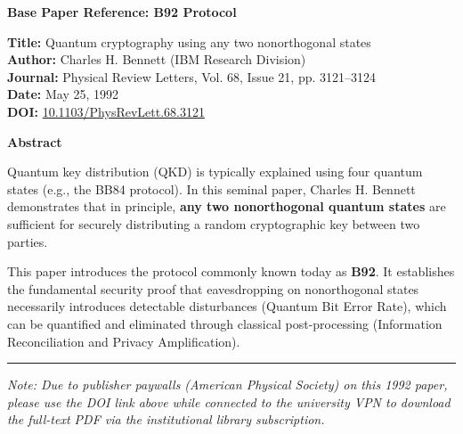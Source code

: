 \documentclass[12pt]{article}
\begin{document}
\begin{center}
    \Large\textbf{Base Paper Reference: B92 Protocol}
\end{center}
\vspace{0.5cm}

\noindent\textbf{Title:} Quantum cryptography using any two nonorthogonal states \\
\textbf{Author:} Charles H. Bennett (IBM Research Division) \\
\textbf{Journal:} Physical Review Letters, Vol. 68, Issue 21, pp. 3121--3124 \\
\textbf{Date:} May 25, 1992 \\
\textbf{DOI:} \href{https://doi.org/10.1103/PhysRevLett.68.3121}{10.1103/PhysRevLett.68.3121}

\vspace{0.8cm}
\noindent\Large\textbf{Abstract}
\vspace{0.3cm}\normalsize

\noindent Quantum key distribution (QKD) is typically explained using four quantum states (e.g., the BB84 protocol). In this seminal paper, Charles H. Bennett demonstrates that in principle, \textbf{any two nonorthogonal quantum states} are sufficient for securely distributing a random cryptographic key between two parties. 

\vspace{0.3cm}
\noindent This paper introduces the protocol commonly known today as \textbf{B92}. It establishes the fundamental security proof that eavesdropping on nonorthogonal states necessarily introduces detectable disturbances (Quantum Bit Error Rate), which can be quantified and eliminated through classical post-processing (Information Reconciliation and Privacy Amplification).

\vspace{1cm}
\hrule
\vspace{0.3cm}
\noindent \textit{Note: Due to publisher paywalls (American Physical Society) on this 1992 paper, please use the DOI link above while connected to the university VPN to download the full-text PDF via the institutional library subscription.}
\end{document}
